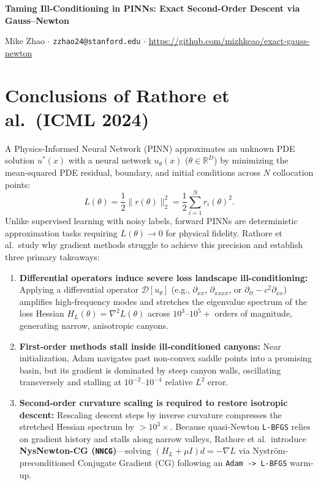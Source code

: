 \documentclass[10pt]{article}
\begin{document}
\begin{center}
\vspace*{-1.0em}
{\large\textbf{Taming Ill-Conditioning in PINNs: Exact Second-Order Descent via Gauss--Newton}\par}
\vspace{0.25em}
{\normalsize Mike Zhao \quad $\cdot$ \quad \texttt{zzhao24@stanford.edu} \quad $\cdot$ \quad \url{https://github.com/mizhkeao/exact-gauss-newton}\par}
\end{center}
\vspace{0.1em}

\section{Conclusions of Rathore et al.\ (ICML 2024)}

A Physics-Informed Neural Network (PINN) approximates an unknown PDE solution $u^*(x)$ with a neural network $u_\theta(x)$ ($\theta \in \mathbb{R}^D$) by minimizing the mean-squared PDE residual, boundary, and initial conditions across $N$ collocation points:
\begin{equation}
L(\theta) = \frac{1}{2}\|r(\theta)\|_2^2 = \frac{1}{2}\sum_{i=1}^N r_i(\theta)^2.
\label{eq:loss}
\end{equation}
Unlike supervised learning with noisy labels, forward PINNs are deterministic approximation tasks requiring $L(\theta) \to 0$ for physical fidelity. Rathore et al.\ study why gradient methods struggle to achieve this precision and establish three primary takeaways:
\begin{enumerate}[leftmargin=1.4em,itemsep=0.10em,topsep=0.12em]
    \item \textbf{Differential operators induce severe loss landscape ill-conditioning:} Applying a differential operator $\mathcal{D}[u_\theta]$ (e.g., $\partial_{xx}$, $\partial_{xxxx}$, or $\partial_{tt} - c^2 \partial_{xx}$) amplifies high-frequency modes and stretches the eigenvalue spectrum of the loss Hessian $H_L(\theta) = \nabla^2 L(\theta)$ across $10^3\text{--}10^5+$ orders of magnitude, generating narrow, anisotropic canyons.
    \item \textbf{First-order methods stall inside ill-conditioned canyons:} Near initialization, Adam navigates past non-convex saddle points into a promising basin, but its gradient is dominated by steep canyon walls, oscillating transversely and stalling at $10^{-2}\text{--}10^{-4}$ relative $L^2$ error.
    \item \textbf{Second-order curvature scaling is required to restore isotropic descent:} Rescaling descent steps by inverse curvature compresses the stretched Hessian spectrum by $>10^3\times$. Because quasi-Newton \texttt{L-BFGS} relies on gradient history and stalls along narrow valleys, Rathore et al.\ introduce \textbf{NysNewton-CG (\texttt{NNCG})}---solving $(H_L + \mu I) d = -\nabla L$ via Nystr\"om-preconditioned Conjugate Gradient (CG) following an \texttt{Adam -> L-BFGS} warm-up.
\end{enumerate}
\end{document}
